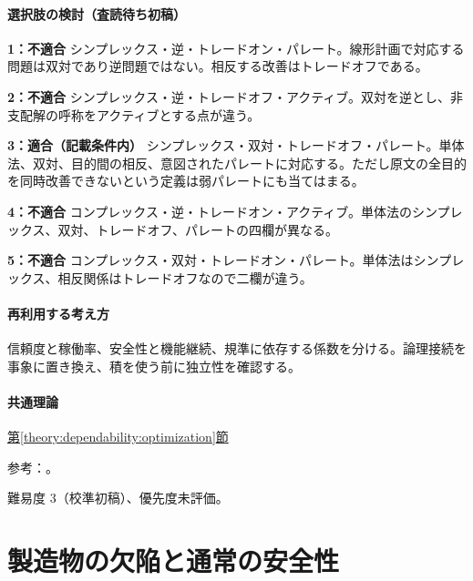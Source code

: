 \paragraph{選択肢の検討（査読待ち初稿）}\mbox{}\par

\noindent\textbf{1：不適合} シンプレックス・逆・トレードオン・パレート。線形計画で対応する問題は双対であり逆問題ではない。相反する改善はトレードオフである。\par

\noindent\textbf{2：不適合} シンプレックス・逆・トレードオフ・アクティブ。双対を逆とし、非支配解の呼称をアクティブとする点が違う。\par

\noindent\textbf{3：適合（記載条件内）} シンプレックス・双対・トレードオフ・パレート。単体法、双対、目的間の相反、意図されたパレートに対応する。ただし原文の全目的を同時改善できないという定義は弱パレートにも当てはまる。\par

\noindent\textbf{4：不適合} コンプレックス・逆・トレードオン・アクティブ。単体法のシンプレックス、双対、トレードオフ、パレートの四欄が異なる。\par

\noindent\textbf{5：不適合} コンプレックス・双対・トレードオン・パレート。単体法はシンプレックス、相反関係はトレードオフなので二欄が違う。\par

\paragraph{再利用する考え方} 信頼度と稼働率、安全性と機能継続、規準に依存する係数を分ける。論理接続を事象に置き換え、積を使う前に独立性を確認する。

\paragraph{共通理論} \hyperref[theory:dependability:optimization]{第\ref*{theory:dependability:optimization}節}

\par 参考：\cite{design_mit_lp}。

\par 難易度 3（校準初稿）、優先度未評価。

\section{製造物の欠陥と通常の安全性}

